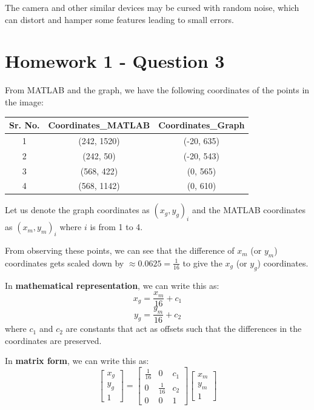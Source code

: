 \documentclass{article}
\begin{document}
The camera and other similar devices may be cursed with random noise, which can distort and hamper some features leading to small errors.

\newpage
\section{Homework 1 - Question 3}

From MATLAB and the graph, we have the following coordinates of the points in the image:
\begin{table}[H]
\centering
\begin{tabular}{|c|c|c|}
\hline
Sr. No. & Coordinates\_MATLAB & Coordinates\_Graph \\
\hline
1 & (242, 1520) & (-20, 635) \\
\hline
2 & (242, 50) & (-20, 543) \\
\hline
3 & (568, 422) & (0, 565) \\
\hline
4 & (568, 1142) & (0, 610) \\
\hline
\end{tabular}
\end{table}

Let us denote the graph coordinates as $(x_g, y_g)_i$ and the MATLAB coordinates as $(x_m, y_m)_i$ where $i$ is from 1 to 4.

\vspace{5pt}
From observing these points, we can see that the difference of $x_m$ (or $y_m$) coordinates gets scaled down by $\approx 0.0625 = \frac{1}{16}$ to give the $x_g$ (or $y_g$) coordinates.

\hrulefill

\vspace{5pt}
In {\bf mathematical representation}, we can write this as:
\begin{equation}
x_g = \frac{x_m}{16} + c_1
\end{equation}
\begin{equation}
y_g = \frac{y_m}{16} + c_2
\end{equation}
where $c_1$ and $c_2$ are constants that act as offsets such that the differences in the coordinates are preserved.

\hrulefill

\vspace{5pt}
In \textbf{matrix form}, we can write this as:
\begin{equation}
\begin{bmatrix}
x_g \\
y_g \\
1
\end{bmatrix}
=
\begin{bmatrix}
\frac{1}{16} & 0 & c_1 \\
0 & \frac{1}{16} & c_2 \\
0 & 0 & 1
\end{bmatrix}
\begin{bmatrix}
x_m \\
y_m \\
1
\end{bmatrix}
\end{equation}
\end{document}
